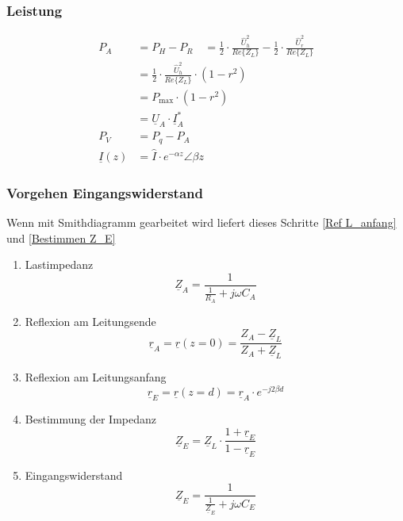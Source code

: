\subsubsection{Leistung}
\begin{align*}
	P_{A}            & = P_{H}-P_{R}                                                                                                
	\quad = \frac{1}{2} \cdot \frac{\hat{U}_{h}^{2}}{Re\{Z_{L}\}}-\frac{1}{2} \cdot \frac{\hat{U}_{r}^{2}}{Re\{Z_{L}\}} \\
	& =\frac{1}{2} \cdot \frac{\hat{U}_{h}^{2}}{Re\{Z_{L}\}} \cdot\left(1-r^{2}\right)                              \\
	& = P_{\max} \cdot\left(1-r^{2}\right)                                                                          \\
	& = \underline{U}_A\cdot\underline{I}_A^*                                                                       \\
	P_V              & = P_q -P_A                                                                                                    \\
	\underline{I}(z) & = \hat{I}\cdot e^{-\alpha z}\angle \beta z
\end{align*}

\subsubsection{Vorgehen Eingangswiderstand}
Wenn mit Smithdiagramm gearbeitet wird liefert dieses Schritte \ref{Ref L_anfang} und \ref{Bestimmen Z_E}
\begin{enumerate}
    \item Lastimpedanz
          \[ \underline{Z}_A = \dfrac{1}{\frac{1}{R_A} + j \omega C_A} \]
    \item Reflexion am Leitungsende
          \[ \underline{r}_A = \underline{r}(z=0) = \dfrac{Z_A - \underline{Z}_L}{Z_A + \underline{Z}_L} \]
    \item Reflexion am Leitungsanfang \label{Ref L_anfang}
          \[ \underline{r}_E = \underline{r}(z=d) =  \underline{r}_A \cdot e^{-j 2 \beta d}\]
    \item Bestimmung der Impedanz \label{Bestimmen Z_E}
          \[ \underline{Z}_E = \underline{Z}_L \cdot \dfrac{1 + \underline{r}_E}{1 - \underline{r}_E}\]
    \item Eingangswiderstand
          \[ \underline{Z}_E = \dfrac{1}{\frac{1}{\underline{Z}_E} + j \omega C_E}\]
\end{enumerate}

